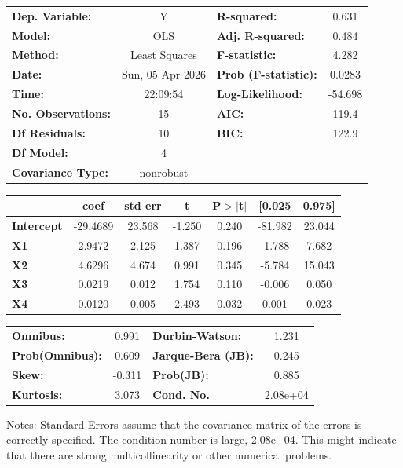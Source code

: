 \begin{center}
\begin{tabular}{lclc}
\toprule
\textbf{Dep. Variable:}    &        Y         & \textbf{  R-squared:         } &     0.631   \\
\textbf{Model:}            &       OLS        & \textbf{  Adj. R-squared:    } &     0.484   \\
\textbf{Method:}           &  Least Squares   & \textbf{  F-statistic:       } &     4.282   \\
\textbf{Date:}             & Sun, 05 Apr 2026 & \textbf{  Prob (F-statistic):} &   0.0283    \\
\textbf{Time:}             &     22:09:54     & \textbf{  Log-Likelihood:    } &   -54.698   \\
\textbf{No. Observations:} &          15      & \textbf{  AIC:               } &     119.4   \\
\textbf{Df Residuals:}     &          10      & \textbf{  BIC:               } &     122.9   \\
\textbf{Df Model:}         &           4      & \textbf{                     } &             \\
\textbf{Covariance Type:}  &    nonrobust     & \textbf{                     } &             \\
\bottomrule
\end{tabular}
\begin{tabular}{lcccccc}
                   & \textbf{coef} & \textbf{std err} & \textbf{t} & \textbf{P$> |$t$|$} & \textbf{[0.025} & \textbf{0.975]}  \\
\midrule
\textbf{Intercept} &     -29.4689  &       23.568     &    -1.250  &         0.240        &      -81.982    &       23.044     \\
\textbf{X1}        &       2.9472  &        2.125     &     1.387  &         0.196        &       -1.788    &        7.682     \\
\textbf{X2}        &       4.6296  &        4.674     &     0.991  &         0.345        &       -5.784    &       15.043     \\
\textbf{X3}        &       0.0219  &        0.012     &     1.754  &         0.110        &       -0.006    &        0.050     \\
\textbf{X4}        &       0.0120  &        0.005     &     2.493  &         0.032        &        0.001    &        0.023     \\
\bottomrule
\end{tabular}
\begin{tabular}{lclc}
\textbf{Omnibus:}       &  0.991 & \textbf{  Durbin-Watson:     } &    1.231  \\
\textbf{Prob(Omnibus):} &  0.609 & \textbf{  Jarque-Bera (JB):  } &    0.245  \\
\textbf{Skew:}          & -0.311 & \textbf{  Prob(JB):          } &    0.885  \\
\textbf{Kurtosis:}      &  3.073 & \textbf{  Cond. No.          } & 2.08e+04  \\
\bottomrule
\end{tabular}
\end{center}

Notes: \newline
 [1] Standard Errors assume that the covariance matrix of the errors is correctly specified. \newline
 [2] The condition number is large, 2.08e+04. This might indicate that there are \newline
 strong multicollinearity or other numerical problems.